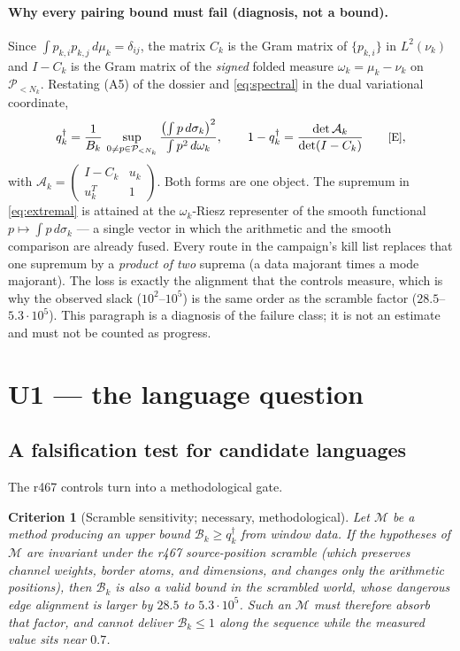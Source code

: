 \documentclass[11pt]{article}
\newtheorem{criterion}{Criterion}
\theoremstyle{remark}
\newcommand{\qdag}{q^{\dagger}}
\newcommand{\Pdeg}{\mathcal P}
\newcommand{\Egrade}{\textnormal{\small[E]}}
\begin{document}
\paragraph{Why every pairing bound must fail (diagnosis, not a bound).}
Since $\int p_{k,i}p_{k,j}\,d\mu_k=\delta_{ij}$, the matrix $C_k$ is
the Gram matrix of $\{p_{k,i}\}$ in $L^2(\nu_k)$ and $I-C_k$ is the
Gram matrix of the \emph{signed} folded measure
$\omega_k=\mu_k-\nu_k$ on $\Pdeg_{<N_k}$.  Restating (A5) of the
dossier and \eqref{eq:spectral} in the dual variational coordinate,
\begin{equation}\label{eq:extremal}
 \qdag_k
 =\frac1{B_k}\,
 \sup_{0\neq p\in\Pdeg_{<N_k}}
 \frac{\bigl(\int p\,d\sigma_k\bigr)^2}{\int p^2\,d\omega_k},
 \qquad
 1-\qdag_k=\frac{\det\mathcal A_k}{\det(I-C_k)}
 \qquad\Egrade,
\end{equation}
with $\mathcal A_k=\left(\begin{smallmatrix}I-C_k&u_k\\
u_k^{T}&1\end{smallmatrix}\right)$.  Both forms are one object.  The
supremum in \eqref{eq:extremal} is attained at the
$\omega_k$-Riesz representer of the smooth functional
$p\mapsto\int p\,d\sigma_k$ --- a single vector in which the
arithmetic and the smooth comparison are already fused.  Every route
in the campaign's kill list replaces that one supremum by a
\emph{product of two} suprema (a data majorant times a mode
majorant).  The loss is exactly the alignment that the controls
measure, which is why the observed slack ($10^{2}$--$10^{5}$) is the
same order as the scramble factor ($28.5$--$5.3\cdot10^{5}$).  This
paragraph is a diagnosis of the failure class; it is not an estimate
and must not be counted as progress.

\section{U1 --- the language question}\label{sec:u1}

\subsection{A falsification test for candidate languages}

The r467 controls turn into a methodological gate.

\begin{criterion}[Scramble sensitivity; necessary, methodological]
\label{crit:scramble}
Let $\mathcal M$ be a method producing an upper bound
$\mathcal B_k\ge\qdag_k$ from window data.  If the hypotheses of
$\mathcal M$ are invariant under the r467 source-position scramble
(which preserves channel weights, border atoms, and dimensions, and
changes only the arithmetic positions), then $\mathcal B_k$ is also a
valid bound in the scrambled world, whose dangerous edge alignment is
larger by $28.5$ to $5.3\cdot10^{5}$.  Such an $\mathcal M$ must
therefore absorb that factor, and cannot deliver $\mathcal B_k\le1$
along the sequence while the measured value sits near $0.7$.
\end{criterion}
\end{document}
